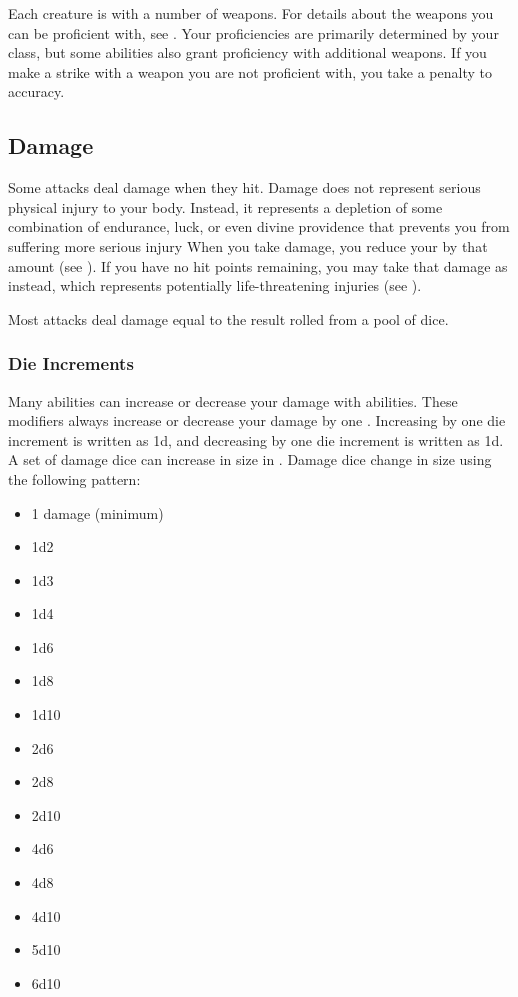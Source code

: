              Each creature is  with a number of weapons.
            For details about the weapons you can be proficient with, see .
            Your proficiencies are primarily determined by your class, but some abilities also grant proficiency with additional weapons.
            If you make a strike with a weapon you are not proficient with, you take a  penalty to accuracy.

    \subsection{Damage}\label{Damage}
        Some attacks deal damage when they hit.
        Damage does not represent serious physical injury to your body.
        Instead, it represents a depletion of some combination of endurance, luck, or even divine providence that prevents you from suffering more serious injury
        When you take damage, you reduce your  by that amount (see ).
        If you have no hit points remaining, you may take that damage as  instead, which represents potentially life-threatening injuries (see ).

        Most attacks deal damage equal to the result rolled from a pool of dice.

        \subsubsection{Die Increments}\label{Die Increments}
            Many abilities can increase or decrease your damage with abilities.
            These modifiers always increase or decrease your damage by one .
            Increasing by one die increment is written as \plus1d, and decreasing by one die increment is written as \minus1d.
            A set of damage dice can increase in size in .
            Damage dice change in size using the following pattern:
            \begin{itemize}
                \item 1 damage (minimum)
                \item 1d2
                \item 1d3
                \item 1d4
                \item 1d6
                \item 1d8
                \item 1d10
                \item 2d6
                \item 2d8
                \item 2d10
                \item 4d6
                \item 4d8
                \item 4d10
                \item 5d10
                \item 6d10
            \end{itemize}

